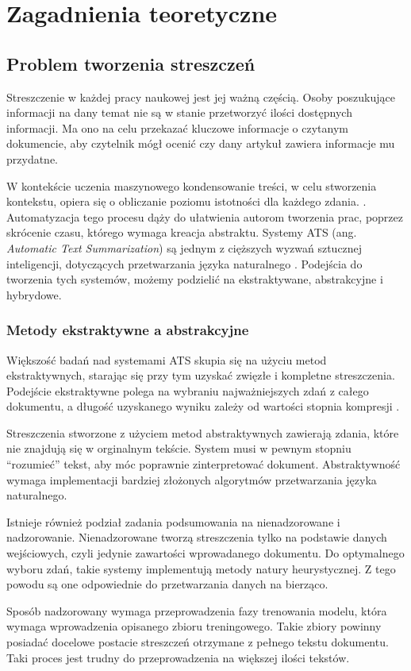 \documentclass[12pt,a4paper,twoside]{article}
\begin{document}
\section{Zagadnienia teoretyczne}
\subsection{Problem tworzenia streszczeń}
Streszczenie w każdej pracy naukowej jest jej ważną częścią. Osoby poszukujące informacji na dany temat nie są w stanie przetworzyć ilości dostępnych informacji. Ma ono na celu przekazać kluczowe informacje o czytanym dokumencie, aby czytelnik mógł ocenić czy dany artykuł zawiera informacje mu przydatne. \par
W kontekście uczenia maszynowego kondensowanie treści, w celu stworzenia kontekstu, opiera się o obliczanie poziomu istotności dla każdego zdania. \cite{MUTLU2020102359}. Automatyzacja tego procesu dąży do ułatwienia autorom tworzenia prac, poprzez skrócenie czasu, którego wymaga kreacja abstraktu. Systemy ATS (ang. \textit{Automatic Text Summarization}) są jednym z cięższych wyzwań sztucznej inteligencji, dotyczących przetwarzania języka naturalnego \cite{ELKASSAS2021113679}. Podejścia do tworzenia tych systemów, możemy podzielić na ekstraktywane, abstrakcyjne i hybrydowe. 
\subsubsection{Metody ekstraktywne a abstrakcyjne}
Większość badań nad systemami ATS skupia się na użyciu metod ekstraktywnych, starając się przy tym uzyskać zwięzłe i kompletne streszczenia. Podejście ekstraktywne polega na wybraniu najważniejszych zdań z całego dokumentu, a długość uzyskanego wyniku zależy od wartości stopnia kompresji \cite{Gambhir2017}. \par
Streszczenia stworzone z użyciem metod abstraktywnych zawierają zdania, które nie znajdują się w orginalnym tekście. System musi w pewnym stopniu ``rozumieć'' tekst, aby móc poprawnie zinterpretować dokument. Abstraktywność wymaga implementacji bardziej złożonych algorytmów przetwarzania języka naturalnego.\par
Istnieje również podział zadania podsumowania na nienadzorowane i nadzorowanie. Nienadzorowane tworzą streszczenia tylko na podstawie danych wejściowych, czyli jedynie zawartości wprowadanego dokumentu. Do optymalnego wyboru zdań, takie systemy implementują metody natury heurystycznej. Z tego powodu są one odpowiednie do przetwarzania danych na bierząco.\par
Sposób nadzorowany wymaga przeprowadzenia fazy trenowania modelu, która wymaga wprowadzenia opisanego zbioru treningowego. Takie zbiory powinny posiadać docelowe postacie streszczeń otrzymane z pełnego tekstu dokumentu. Taki proces jest trudny do przeprowadzenia na większej ilości tekstów.
\end{document}
